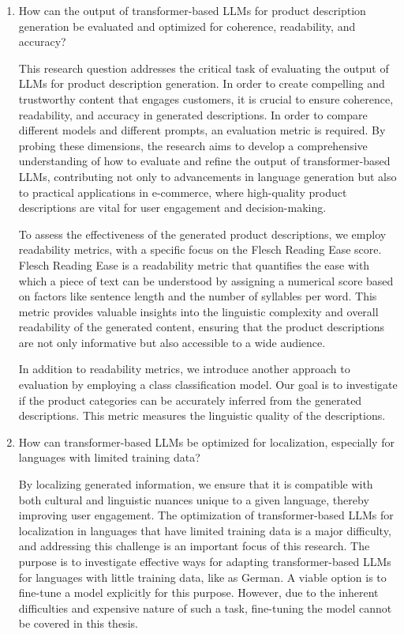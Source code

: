 \begin{enumerate}
    \item How can the output of transformer-based LLMs for product description generation be evaluated and optimized for coherence, readability, and accuracy?

    This research question addresses the critical task of evaluating the output of LLMs for product description generation. In order to create compelling and trustworthy content that engages customers, it is crucial to ensure coherence, readability, and accuracy in generated descriptions. In order to compare different models and different prompts, an evaluation metric is required. By probing these dimensions, the research aims to develop a comprehensive understanding of how to evaluate and refine the output of transformer-based LLMs, contributing not only to advancements in language generation but also to practical applications in e-commerce, where high-quality product descriptions are vital for user engagement and decision-making.

    To assess the effectiveness of the generated product descriptions, we employ readability metrics, with a specific focus on the Flesch Reading Ease score. Flesch Reading Ease is a readability metric that quantifies the ease with which a piece of text can be understood by assigning a numerical score based on factors like sentence length and the number of syllables per word. This metric provides valuable insights into the linguistic complexity and overall readability of the generated content, ensuring that the product descriptions are not only informative but also accessible to a wide audience.

    In addition to readability metrics, we introduce another approach to evaluation by employing a class classification model. Our goal is to investigate if the product categories can be accurately inferred from the generated descriptions. This metric measures the linguistic quality of the descriptions.

    \item How can transformer-based LLMs be optimized for localization, especially for languages with limited training data?

    By localizing generated information, we ensure that it is compatible with both cultural and linguistic nuances unique to a given language, thereby improving user engagement. The optimization of transformer-based LLMs for localization in languages that have limited training data is a major difficulty, and addressing this challenge is an important focus of this research. The purpose is to investigate effective ways for adapting transformer-based LLMs for languages with little training data, like as German. A viable option is to fine-tune a model explicitly for this purpose. However, due to the inherent difficulties and expensive nature of such a task, fine-tuning the model cannot be covered in this thesis.
    

\end{enumerate}

